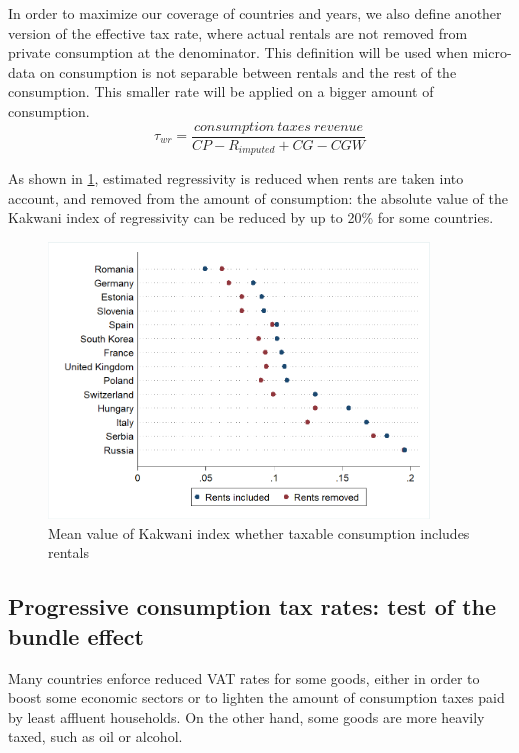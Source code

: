 In order to maximize our coverage of countries and years, we also define another version of the effective tax rate, where actual rentals are not removed from private consumption at the denominator. This definition will be used when micro-data on consumption is not separable between rentals and the rest of the consumption. This smaller rate will be applied on a bigger amount of consumption.
\[ \tau_{wr}= \frac{consumption\ taxes\ revenue}{CP - R_{imputed} + CG - CGW}\]

As shown in \cref{fig:kakrent}, estimated regressivity is reduced when rents are taken into account, and removed from the amount of consumption: the absolute value of the Kakwani index of regressivity can be reduced by up to 20\% for some countries.

\begin{figure}
\centering
\includegraphics[width=0.9\textwidth]{images/18-03-18_kak_kak_wor_mean}
\caption{\label{fig:kakrent} Mean value of Kakwani index whether taxable consumption includes rentals}
\end{figure}

\subsection{Progressive consumption tax rates: test of the bundle effect}
\label{sec:diff_rates}  
Many countries enforce reduced VAT rates for some goods, either in order to boost some economic sectors or to lighten the amount of consumption taxes paid by least affluent households. On the other hand, some goods are more heavily taxed, such as oil or alcohol.


